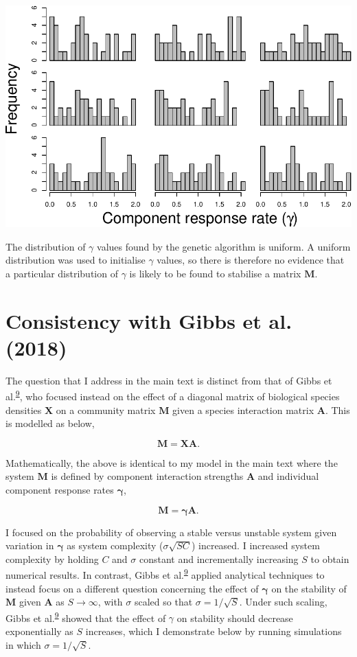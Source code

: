 \documentclass[]{article}
\begin{document}
\includegraphics{unnamed-chunk-32-1.pdf}

The distribution of \(\gamma\) values found by the genetic algorithm is
uniform. A uniform distribution was used to initialise \(\gamma\)
values, so there is therefore no evidence that a particular distribution
of \(\gamma\) is likely to be found to stabilise a matrix
\(\mathbf{M}\).

\hypertarget{Gibbs}{\section{Consistency with Gibbs et al.
(2018)}\label{Gibbs}}

The question that I address in the main text is distinct from that of
Gibbs et al.\textsuperscript{\protect\hyperlink{ref-Gibbs2017}{9}}, who
focused instead on the effect of a diagonal matrix of biological species
densities \(\mathbf{X}\) on a community matrix \(\mathbf{M}\) given a
species interaction matrix \(\mathbf{A}\). This is modelled as below,

\[\mathbf{M} = \mathbf{XA}.\]

Mathematically, the above is identical to my model in the main text
where the system \(\mathbf{M}\) is defined by component interaction
strengths \(\mathbf{A}\) and individual component response rates
\(\boldsymbol{\gamma}\),

\[\mathbf{M} = \mathbf{\gamma A}.\]

I focused on the probability of observing a stable versus unstable
system given variation in \(\mathbf{\gamma}\) as system complexity
(\(\sigma\sqrt{SC}\)) increased. I increased system complexity by
holding \(C\) and \(\sigma\) constant and incrementally increasing \(S\)
to obtain numerical results. In contrast, Gibbs et
al.\textsuperscript{\protect\hyperlink{ref-Gibbs2017}{9}} applied
analytical techniques to instead focus on a different question
concerning the effect of \(\mathbf{\gamma}\) on the stability of
\(\mathbf{M}\) given \(\mathbf{A}\) as \(S \to \infty\), with \(\sigma\)
scaled so that \(\sigma = 1/\sqrt{S}\). Under such scaling, Gibbs et
al.\textsuperscript{\protect\hyperlink{ref-Gibbs2017}{9}} showed that
the effect of \(\gamma\) on stability should decrease exponentially as
\(S\) increases, which I demonstrate below by running simulations in
which \(\sigma = 1/\sqrt{S}\).
\end{document}
